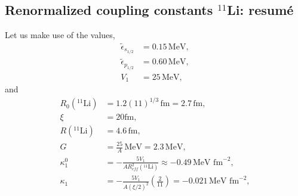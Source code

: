 \begin{subappendices}
 \section{Renormalized coupling constants $^{11}$Li: resum\'e}\label{C2SF2}
 Let us make use of the values,
 \begin{align}
 \nonumber \tilde\epsilon_{s_{1/2}}&=0.15\, \text{MeV},\\
\nonumber  \tilde\epsilon_{p_{1/2}}&=0.60\, \text{MeV},\\
  V_1&=25\, \text{MeV},
 \end{align}
and 
  \begin{align}
R_0(^{11}\text{Li})&=1.2 (11)^{1/3}\,\text{fm}=2.7\,\text{fm},\\
\xi&=20\text{fm},\\
R(^{11}\text{Li})&=4.6\,\text{fm},\\
G&=\frac{25}{A}\,\text{MeV}=2.3\,\text{MeV},\\
\kappa_1^0&=-\frac{5V_1}{A R_{eff}^2(^{11}\text{Li})}\approx -0.49\,\text{MeV fm}^{-2},\\
\kappa_1&=-\frac{5V_1}{A \left(\xi/2\right)^2}\left(\frac{2}{11}\right)= -0.021\,\text{MeV fm}^{-2},
  \end{align}

 
 

\end{subappendices}
